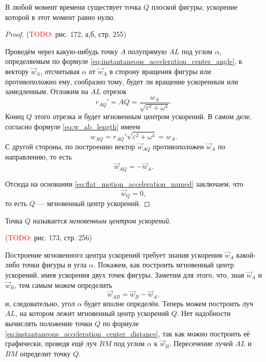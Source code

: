 \begin{theorem}
  В любой момент времени существует точка $Q$ плоской фигуры, ускорение которой
  в этот момент равно нулю.
\end{theorem}

\begin{proof}
  (\textcolor{red}{TODO:} рис. 172, а,б, стр. 255)

  Проведём через какую-нибудь точку $A$ полупрямую $AL$ под углом $\alpha$,
  определяемым по формуле \ref{eq:instantaneous_acceleration_center_angle}, к
  вектору $\vec{w}_A$, отсчитывая $\alpha$ от $\vec{w}_A$ в сторону вращения
  фигуры или противоположно ему, сообразно тому, будет ли вращение ускоренным
  или замедленным. Отложим на $AL$ отрезок
  \begin{equation}
    \label{eq:instantaneous_acceleration_center_distance}
    r_{AQ}' = AQ = \frac{w_A}{\sqrt{\varepsilon^2 + \omega^4}}.
  \end{equation}
  Конец $Q$ этого отрезка и будет мгновенным центром ускорений. В самом деле,
  согласно формуле \ref{eq:w_ab_length} имеем
  \begin{equation*}
    w_{AQ} = r_{AQ}' \sqrt{\varepsilon^2 + \omega^4} = w_A.
  \end{equation*}
  С другой стороны, по построению вектор $\vec{w}_{AQ}$ противоположен
  $\vec{w}_A$ по направлению, то есть
  \begin{equation*}
    \vec{w}_{AQ} = -\vec{w}_A.
  \end{equation*}

  Отсюда на основании \ref{eq:flat_motion_acceleration_named} заключаем, что
  \begin{equation*}
    \vec{w}_Q = 0,
  \end{equation*}
  то есть $Q$ --- мгновенный центр ускорений.
\end{proof}

\begin{definition}
  Точка $Q$ называется \textit{мгновенным центром ускорений}.
\end{definition}

(\textcolor{red}{TODO:} рис. 173, стр. 256)

Построение мгновенного центра ускорений требует знания ускорения $\vec{w}_A$
какой-либо точки фигуры и угла $\alpha$. Покажем, как построить мгновенный
центр ускорений, имея ускорения двух точек фигуры. Заметим для этого, что, зная
$\vec{w}_A$ и $\vec{w}_B$, тем самым можем определить
\begin{equation*}
  \vec{w}_{AB} = \vec{w}_B - \vec{w}_A,
\end{equation*}
и, следовательно, угол $\alpha$ будет вполне определён. Теперь можем построить
луч $AL$, на котором лежит мгновенный центр ускорений $Q$. Нет надобности
вычислять положение точки $Q$ по формуле
\ref{eq:instantaneous_acceleration_center_distance}, так как можно построить её
графически, проведя ещё луч $BM$ под углом $\alpha$ к $\vec{w}_B$. Пересечение
лучей $AL$ и $BM$ определит точку $Q$.

